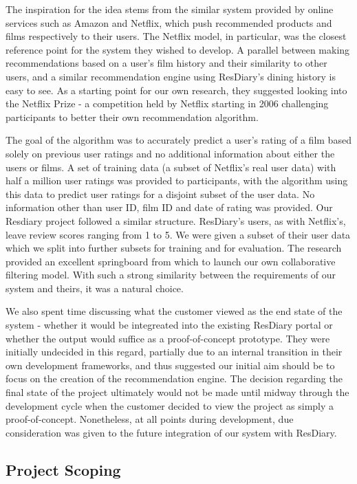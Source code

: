 \documentclass{l3proj}
\begin{document}
The inspiration for the idea stems from the similar system provided by online services such as Amazon and Netflix, which push recommended products and films respectively to their users. The Netflix model, in particular, was the closest reference point for the system they wished to develop. A parallel between making recommendations based on a user's film history and their similarity to other users, and a similar recommendation engine using ResDiary's dining history is easy to see. As a starting point for our own research, they suggested looking into the Netflix Prize - a competition held by Netflix starting in 2006 challenging participants to better their own recommendation algorithm. 

The goal of the algorithm was to accurately predict a user's rating of a film based solely on previous user ratings and no additional information about either the users or films. A set of training data (a subset of Netflix's real user data) with half a million user ratings was provided to participants, with the algorithm using this data to predict user ratings for a disjoint subset of the user data. No information other than user ID, film ID and date of rating was provided. Our Resdiary project followed a similar structure. ResDiary's users, as with Netflix's, leave review scores ranging from 1 to 5. We were given a subset of their user data which we split into further subsets for training and for evaluation. The research provided an excellent springboard from which to launch our own collaborative filtering model. With such a strong similarity between the requirements of our system and theirs, it was a natural choice.

We also spent time discussing what the customer viewed as the end state of the system - whether it would be integreated into the existing ResDiary portal or whether the output would suffice as a proof-of-concept prototype. They were initially undecided in this regard, partially due to an internal transition in their own development frameworks, and thus suggested our initial aim should be to focus on the creation of the recommendation engine. The decision regarding the final state of the project ultimately would not be made until midway through the development cycle when the customer decided to view the project as simply a proof-of-concept. Nonetheless, at all points during development, due consideration was given to the future integration of our system with ResDiary. 


\subsection{Project Scoping}
\label{sec:ourinitobjectives}
\end{document}
